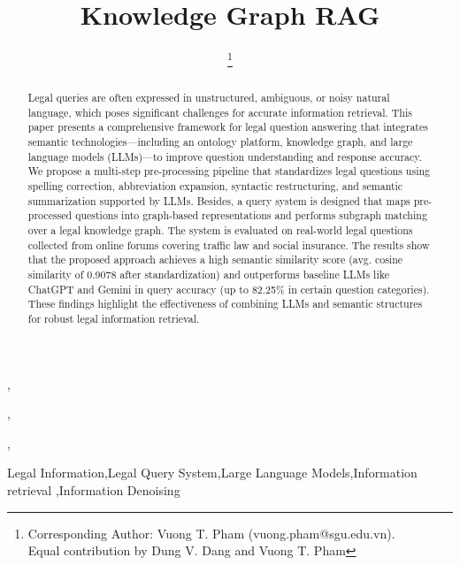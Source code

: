 \documentclass{IOS-Book-Article}
\def\hb{\hbox to 11.5 cm{}}
\begin{document}
\pagestyle{headings}
\def\thepage{}
\begin{frontmatter}        %


\title{Knowledge Graph RAG}


\markboth{}{May 2025\hb}

\author[A,C]{ %
},
\author[B,C,D]{ \thanks{Corresponding Author: Vuong T. Pham  (vuong.pham@sgu.edu.vn).\\Equal contribution by Dung V. Dang and Vuong T. Pham}}
,
\author[A,C]{ }
,


\address[A]{University of Information Technology, Ho Chi Minh city, Vietnam}
\address[B]{University of Science, Ho Chi Minh city, Vietnam}
\address[C]{Vietnam National University, Ho Chi Minh city, Vietnam}
\address[D]{Sai Gon University, Ho Chi Minh city, Vietnam}
\address[E]{Computer Science Department, New Mexico State University, USA}

\begin{abstract}
Legal queries are often expressed in unstructured, ambiguous, or noisy natural language, which poses significant challenges for accurate information retrieval. This paper presents a comprehensive framework for legal question answering that integrates semantic technologies—including an ontology platform, knowledge graph, and large language models (LLMs)—to improve question understanding and response accuracy. We propose a multi-step pre-processing pipeline that standardizes legal questions using spelling correction, abbreviation expansion, syntactic restructuring, and semantic summarization supported by LLMs. Besides, a query system is designed that maps pre-processed questions into graph-based representations and performs subgraph matching over a legal knowledge graph. The system is evaluated on real-world legal questions collected from online forums covering traffic law and social insurance. The results show that the proposed approach achieves a high semantic similarity score (avg. cosine similarity of 0.9078 after standardization) and outperforms baseline LLMs like ChatGPT and Gemini in query accuracy (up to 82.25\% in certain question categories). These findings highlight the effectiveness of combining LLMs and semantic structures for robust legal information retrieval.

\end{abstract}

\begin{keyword}
Legal Information\sep Legal Query System\sep Large Language Models\sep Information retrieval \sep Information Denoising
\end{keyword}
\end{frontmatter}
\markboth{May 2025\hb}{May 2025\hb}
\end{document}
